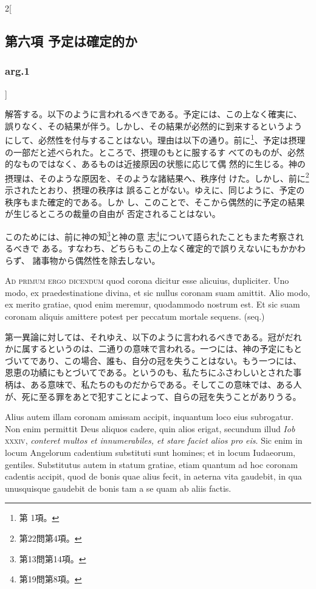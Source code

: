 \documentclass[paper=a4paper,fontsize=10pt,jafontsize=9pt,titlepage]{jlreq}
\begin{document}
\begin{paracol}{2}[\subsection{第六項 予定は確定的か}\subsubsection{arg.1}]
\switchcolumn


解答する。以下のように言われるべきである。予定には、この上なく確実に、
誤りなく、その結果が伴う。しかし、その結果が必然的に到来するというよう
にして、必然性を付与することはない。理由は以下の通り。前に\footnote{第
1項。}、予定は摂理の一部だと述べられた。ところで、摂理のもとに服するす
べてのものが、必然的なものではなく、あるものは近接原因の状態に応じて偶
然的に生じる。神の摂理は、そのような原因を、そのような諸結果へ、秩序付
けた。しかし、前に\footnote{第22問第4項。}示されたとおり、摂理の秩序は
誤ることがない。ゆえに、同じように、予定の秩序もまた確定的である。しか
し、このことで、そこから偶然的に予定の結果が生じるところの裁量の自由が
否定されることはない。

\hspace{2em}このためには、前に神の知\footnote{第13問第14項。}と神の意
 志\footnote{第19問第8項。}について語られたこともまた考察されるべきで
 ある。すなわち、どちらもこの上なく確定的で誤りえないにもかかわらず、
 諸事物から偶然性を除去しない。


\switchcolumn*[\subsubsection{ad.1}]


{\scshape Ad primum ergo dicendum} quod corona dicitur
esse alicuius, dupliciter. Uno modo, ex praedestinatione divina, et sic
nullus coronam suam amittit. Alio modo, ex merito gratiae, quod enim
meremur, quodammodo nostrum est. Et sic suam coronam aliquis amittere
potest per peccatum mortale sequens. (seq.)


\switchcolumn


第一異論に対しては、それゆえ、以下のように言われるべきである。冠がだれ
かに属するというのは、二通りの意味で言われる。一つには、神の予定にもと
づいてであり、この場合、誰も、自分の冠を失うことはない。もう一つには、
恩恵の功績にもとづいてである。というのも、私たちにふさわしいとされた事
柄は、ある意味で、私たちのものだからである。そしてこの意味では、ある人
が、死に至る罪をあとで犯すことによって、自らの冠を失うことがありうる。


\switchcolumn*


Alius autem illam coronam amissam
accipit, inquantum loco eius subrogatur. Non enim permittit Deus aliquos
cadere, quin alios erigat, secundum illud {\itshape Iob} {\scshape xxxiv}, {\itshape conteret multos et
innumerabiles, et stare faciet alios pro eis}.
Sic enim in locum
Angelorum cadentium substituti sunt homines; et in locum Iudaeorum,
gentiles. Substitutus autem in statum gratiae, etiam quantum ad hoc
coronam cadentis accipit, quod de bonis quae alius fecit, in aeterna
vita gaudebit, in qua unusquisque gaudebit de bonis tam a se quam ab
aliis factis.



\end{paracol}
\end{document}
